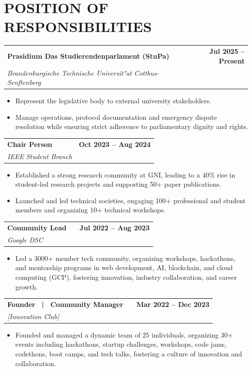 \documentclass[a4paper,11pt]{article}
\makeatletter
\newcommand{\entryheader}[4]{%
  \begin{tabularx}{\textwidth}{@{}>{\RaggedRight\arraybackslash}X r@{}}
    \textbf{#1} & \textbf{#2} \\
    \textit{#3} & \textit{#4} \\
  \end{tabularx}%
}
\newenvironment{entrybullets}{%
  \begin{minipage}[t]{0.77\textwidth}
    \begin{itemize}[leftmargin=*,label=\textbullet,align=left]
}{%
    \end{itemize}
  \end{minipage}
}
\newcommand{\extlink}{\raisebox{0.2ex}{\scriptsize\faExternalLink*}}
\makeatother
\begin{document}
\section*{POSITION OF RESPONSIBILITIES}
\entryheader{Prasidium Das Studierendenparlament (StuPa)}{Jul 2025 -- Present}{Brandenburgische Technische Universit"at Cottbus-Senftenberg}{}
\begin{entrybullets}
  \item Represent the legislative body to external university stakeholders.
  \item Manage operations, protocol documentation and emergency dispute resolution while ensuring strict adherence to parliamentary dignity and rights.
\end{entrybullets}

\vspace{0.25cm}
\entryheader{Chair Person}{Oct 2023 -- Aug 2024}{IEEE Student Branch}{}
\begin{entrybullets}
  \item Established a strong research community at GNI, leading to a 40\% rise in student-led research projects and supporting 50+ paper publications.
  \item Launched and led technical societies, engaging 100+ professional and student members and organizing 10+ technical workshops.
\end{entrybullets}

\vspace{0.25cm}
\newpage
\thispagestyle{secondpage}

\entryheader{Community Lead \ \extlink}{Jul 2022 -- Aug 2023}{Google DSC}{}
\begin{entrybullets}
  \item Led a 3000+ member tech community, organizing workshops, hackathons, and mentorship programs in web development, AI, blockchain, and cloud computing (GCP), fostering innovation, industry collaboration, and career growth.
\end{entrybullets}

\vspace{0.25cm}
\entryheader{Founder \ | \ Community Manager \ \extlink}{Mar 2022 -- Dec 2023}{[Innovation Club]}{}
\begin{entrybullets}
  \item Founded and managed a dynamic team of 25 individuals, organizing 30+ events including hackathons, startup challenges, workshops, code jams, codethons, boot camps, and tech talks, fostering a culture of innovation and collaboration.
\end{entrybullets}
\end{document}
